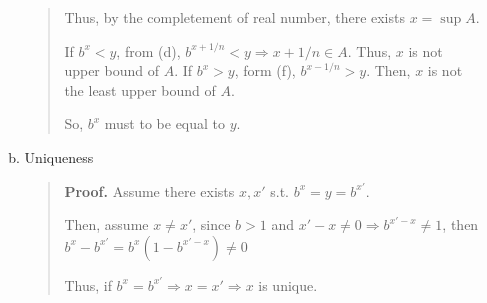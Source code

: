 \documentclass[12pt]{article}
\begin{document}
\begin{enumerate}
\begin{enumerate}[(a)]
\begin{quote}
            Thus, by the completement of real number, there exists $x = \sup A$.

            If $b^x < y$, from (d), $b^{x + 1/n} < y\Rightarrow x + 1/n \in A$. Thus, $x$ is not upper bound of $A$.
            If $b^x > y$, form (f), $b^{x-1/n} > y$. Then, $x$ is not the least upper bound of $A$.

            So, $b^x$ must to be equal to $y$.
        \end{quote}
        \item Uniqueness\begin{quote}
            {\bf Proof.} Assume there exists $x, x'$ s.t. $b^x = y = b^{x'}$.

            Then, assume $x \neq x'$, since $b > 1$ and $x'-x \neq 0\Rightarrow b^{x'-x} \neq 1$, then $b^x - b^{x'} = b^x(1 - b^{x'-x}) \neq 0$

            Thus, if $b^x = b^{x'}\Rightarrow x = x'\Rightarrow x$ is unique.
        \end{quote}
    \end{enumerate}
\end{enumerate}
\end{document}
